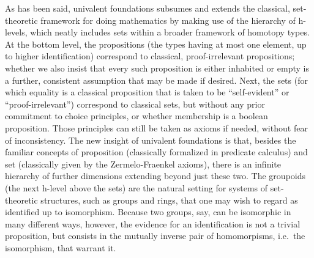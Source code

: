 \documentclass[11pt]{article}
\theoremstyle{remark}
\theoremstyle{definition}
\begin{document}
As has been said, univalent foundations subsumes and extends the classical, set-theoretic framework for doing
mathematics by making use of the hierarchy of h-levels, which neatly includes sets within a broader
framework of homotopy types.  
At the bottom level, the propositions (the types having at most one element, up to higher identification)
correspond to classical, proof-irrelevant propositions; whether we also insist that every such proposition is either inhabited
or empty is a further, consistent assumption that may be made if desired.  
Next, the sets (for which equality is a
classical proposition that is taken to be ``self-evident'' or ``proof-irrelevant'') correspond to classical
sets, but without any prior commitment to choice principles, or whether membership is a boolean proposition.  
Those principles can still be taken as axioms if needed, without fear of inconsistency.  
The new insight of univalent foundations is that, besides the familiar concepts of proposition (classically formalized in predicate calculus) 
and set (classically given by the Zermelo-Fraenkel axioms), there is an infinite hierarchy of further dimensions extending beyond just these two.  The groupoids (the next h-level above the sets) are the natural setting for systems of set-theoretic structures, such as groups and rings, that one may wish to regard as identified up to isomorphism.  Because two groups, say, can be isomorphic in many different ways, however, the evidence for an identification is not a trivial proposition, but consists in the mutually inverse pair of homomorpisms, i.e.\ the isomorphism, that warrant it.
\end{document}
